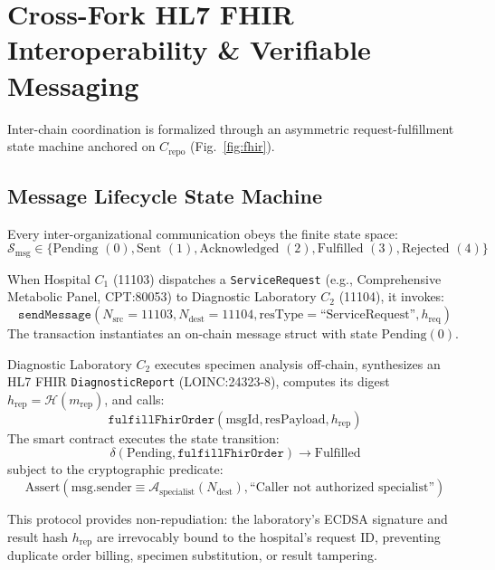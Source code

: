 \documentclass[journal]{IEEEtran}
\theoremstyle{definition}
\begin{document}
\section{Cross-Fork HL7 FHIR Interoperability \& Verifiable Messaging}
Inter-chain coordination is formalized through an asymmetric request-fulfillment state machine anchored on $C_{\text{repo}}$ (Fig.~\ref{fig:fhir}).

\subsection{Message Lifecycle State Machine}
Every inter-organizational communication obeys the finite state space:
\begin{equation}
\mathcal{S}_{\text{msg}} \in \{\text{Pending } (0), \text{Sent } (1), \text{Acknowledged } (2), \text{Fulfilled } (3), \text{Rejected } (4)\}
\end{equation}

When Hospital $C_1$ (11103) dispatches a \texttt{ServiceRequest} (e.g., Comprehensive Metabolic Panel, CPT:80053) to Diagnostic Laboratory $C_2$ (11104), it invokes:
\begin{equation}
\texttt{sendMessage}(N_{\text{src}}=11103, N_{\text{dest}}=11104, \text{resType}=\text{``ServiceRequest''}, h_{\text{req}})
\end{equation}
The transaction instantiates an on-chain message struct with state $\text{Pending} (0)$.

Diagnostic Laboratory $C_2$ executes specimen analysis off-chain, synthesizes an HL7 FHIR \texttt{DiagnosticReport} (LOINC:24323-8), computes its digest $h_{\text{rep}} = \mathcal{H}(m_{\text{rep}})$, and calls:
\begin{equation}
\texttt{fulfillFhirOrder}(\text{msgId}, \text{resPayload}, h_{\text{rep}})
\end{equation}
The smart contract executes the state transition:
\begin{equation}
\delta(\text{Pending}, \texttt{fulfillFhirOrder}) \longrightarrow \text{Fulfilled}
\end{equation}
subject to the cryptographic predicate:
\begin{equation}
\text{Assert}\left(\text{msg.sender} \equiv \mathcal{A}_{\text{specialist}}(N_{\text{dest}}), \text{``Caller not authorized specialist''}\right)
\end{equation}

This protocol provides non-repudiation: the laboratory's ECDSA signature and result hash $h_{\text{rep}}$ are irrevocably bound to the hospital's request ID, preventing duplicate order billing, specimen substitution, or result tampering.
\end{document}
